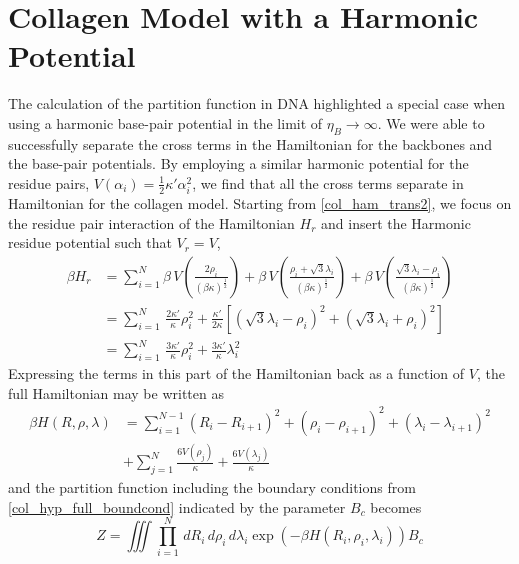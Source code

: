 \section{Collagen Model with a Harmonic Potential}
%
The calculation of the partition function in DNA highlighted a special case when using a harmonic base-pair potential in the limit of $\eta_{B} \to \infty$. We were able to successfully separate the cross terms in the Hamiltonian for the backbones and the base-pair potentials. By employing a similar harmonic potential for the residue pairs, $V\left(\alpha_{i}\right)=\frac{1}{2}\kappa'\alpha_{i}^{2}$, we find that all the cross terms separate in Hamiltonian for the collagen model. Starting from \eqref{col_ham_trans2}, we focus on the residue pair interaction of the Hamiltonian $H_{r}$ and insert the Harmonic residue potential such that $V_{r} = V$,
%
\begin{align}
\beta H_{r}&=\sum_{i=1}^{N}\beta\,V\left(\frac{2\rho_i}{\left( \beta \kappa\right)^{\frac{1}{2}}}\right)+\beta\,V\left(\frac{\rho_i+ \sqrt{3}\lambda_i}{\left( \beta \kappa\right)^{\frac{1}{2}}}\right)+\beta\,V\left(\frac{\sqrt{3}\lambda_i - \rho_i}{\left( \beta \kappa\right)^{\frac{1}{2}}}\right)\nonumber\\
&=\sum_{i=1}^{N}\,\frac{2 \kappa'}{\kappa}\rho_{i}^{2}+\frac{\kappa'}{2\kappa}\left[ \left(\sqrt{3}\lambda_{i}-\rho_{i}\right)^{2} + \left(\sqrt{3}\lambda_{i}+\rho_{i}\right)^{2}\right]\nonumber\\
&=\sum_{i=1}^{N}\,\frac{3 \kappa'}{\kappa}\rho_{i}^{2}+\frac{3 \kappa'}{\kappa}\lambda_{i}^{2}
\end{align}
%
Expressing the terms in this part of the Hamiltonian back as a function of $V$, the full Hamiltonian may be written as
%
\begin{align}
\label{col_ham_harV}
\beta H(R,\rho,\lambda) &= \sum_{i=1}^{N-1} \left(R_i-R_{i+1}\right)^{2}+\left(\rho_i-\rho_{i+1}\right)^{2}+\left(\lambda_i-\lambda_{i+1}\right)^{2}\nonumber\\ 
&+\sum_{j=1}^{N} \frac{6V\left(\rho_j\right)}{\kappa}+\frac{6V\left(\lambda_j\right)}{\kappa}
\end{align}
%
and the partition function including the boundary conditions from \eqref{col_hyp_full_boundcond} indicated by the parameter $B_c$ becomes
%
\begin{equation}\label{col_part_func_int}
Z=\iiint\prod^{N}_{i=1}\,dR_i\,d\rho_i\,d\lambda_i\exp\left(-\beta H\left(R_i,\rho_i,\lambda_i\right)\right)B_c
\end{equation}
%
